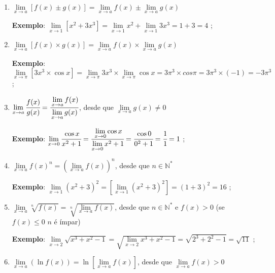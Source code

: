 		\begin{enumerate}[label=(P\arabic*)]

			\item {\LARGE $\lim \limits_{x \to a} [f(x) \pm g(x)] = \lim \limits_{x \to a} f(x) \pm \lim \limits_{x \to a} g(x)$}

			\medskip

			\textbf{Exemplo}: $\lim \limits_{x \to 1} [x^{2} + 3x^{3}] = \lim \limits_{x \to 1} x^{2} + \lim \limits_{x \to 1} 3x^{3} = 1 + 3 = 4$ ;

			\item {\LARGE $\lim \limits_{x \to a} [f(x) \times g(x)] = \lim \limits_{x \to a} f(x) \times \lim \limits_{x \to a} g(x)$}

			\medskip

			\textbf{Exemplo}: $\lim \limits_{x \to \pi} [3x^{3} \times \cos x] = \lim \limits_{x \to \pi} 3x^{3} \times \lim \limits_{x \to \pi} \cos x = 3\pi ^{3} \times cos \pi = 3 \pi ^{3} \times (-1) = - 3 \pi ^{3}$ ;

			\item {\LARGE $\lim \limits_{x \to a} \cfrac{f(x)}{g(x)} = \cfrac{\lim \limits_{x \to a} f(x)}{\lim \limits_{x \to a} g(x)}$, desde que $\lim \limits_{x \to a} g(x) \neq 0$}

			\medskip

			\textbf{Exemplo}: $\lim \limits_{x \to 0} \cfrac{\cos x}{x^{2} + 1} = \cfrac{\lim \limits_{x \to 0} \cos x}{\lim \limits_{x \to 0} x^{2} + 1} = \cfrac{\cos 0}{0^{2} + 1} = \cfrac{1}{1} = 1$ ;

			\item {\LARGE $\lim \limits_{x \to a} f(x)^{n} = \left( \lim \limits_{x \to a} f(x) \right) ^{n}$, desde que $n \in \mathbb{N}^{*}$}

			\medskip

			\textbf{Exemplo}: $\lim \limits_{x \to 1} (x^{2} + 3)^{2} = \left[ \lim \limits_{x \to 1} (x^{2} + 3)^{2} \right] = (1 + 3)^{2} = 16$ ;

			\item {\LARGE $\lim \limits_{x \to a} \sqrt[n]{f(x)} = \sqrt[n]{\lim \limits_{x \to a} f(x)}$, desde que $n \in \mathbb{N}^{*}$ e $f(x) > 0$ (se $f(x) \leq 0$ $n$ é ímpar)}

			\medskip

			\textbf{Exemplo}: $\lim \limits_{x \to 2} \sqrt{x^{3} + x^{2} - 1} = \sqrt{\lim \limits_{x \to 2} x^{3} + x^{2} - 1} = \sqrt{2^{3} + 2^{2} - 1} = \sqrt{11}$ ;

			\item {\LARGE $\lim \limits_{x \to a} (\ln f(x)) = \ln \left[ \lim \limits_{x \to a} f(x) \right]$, desde que $\lim \limits_{x \to a} f(x) > 0$}


\end{enumerate}
